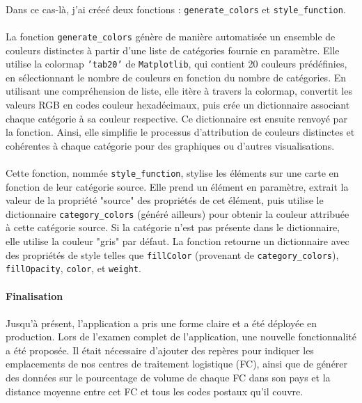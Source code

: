 \paragraph{}
\vspace{-2em}
Dans ce cas-là, j'ai créeé deux fonctions : \texttt{generate\_colors} et \texttt{style\_function}. 
\paragraph{}
\vspace{-2em}
La fonction \texttt{generate\_colors} génère de manière automatisée un ensemble de couleurs distinctes à partir d'une liste de catégories fournie en paramètre. Elle utilise la colormap \texttt{'tab20'} de \texttt{Matplotlib}, qui contient 20 couleurs prédéfinies, en sélectionnant le nombre de couleurs en fonction du nombre de catégories. En utilisant une compréhension de liste, elle itère à travers la colormap, convertit les valeurs RGB en codes couleur hexadécimaux, puis crée un dictionnaire associant chaque catégorie à sa couleur respective. Ce dictionnaire est ensuite renvoyé par la fonction. Ainsi, elle simplifie le processus d'attribution de couleurs distinctes et cohérentes à chaque catégorie pour des graphiques ou d'autres visualisations.

\paragraph{}
\vspace{-2em}
Cette fonction, nommée \texttt{style\_function}, stylise les éléments sur une carte en fonction de leur catégorie source. Elle prend un élément en paramètre, extrait la valeur de la propriété "source" des propriétés de cet élément, puis utilise le dictionnaire \texttt{category\_colors} (généré ailleurs) pour obtenir la couleur attribuée à cette catégorie source. Si la catégorie n'est pas présente dans le dictionnaire, elle utilise la couleur "gris" par défaut. La fonction retourne un dictionnaire avec des propriétés de style telles que \texttt{fillColor} (provenant de \texttt{category\_colors}), \texttt{fillOpacity}, \texttt{color}, et \texttt{weight}. 

\paragraph{}
\vspace{-2em}
{\large\textbf{Finalisation}}
\paragraph{}
\vspace{-2em}
Jusqu'à présent, l'application a pris une forme claire et a été déployée en production. Lors de l'examen complet de l'application, une nouvelle fonctionnalité a été proposée. Il était nécessaire d'ajouter des repères pour indiquer les emplacements de nos centres de traitement logistique (FC), ainsi que de générer des données sur le pourcentage de volume de chaque FC dans son pays et la distance moyenne entre cet FC et tous les codes postaux qu'il couvre.
